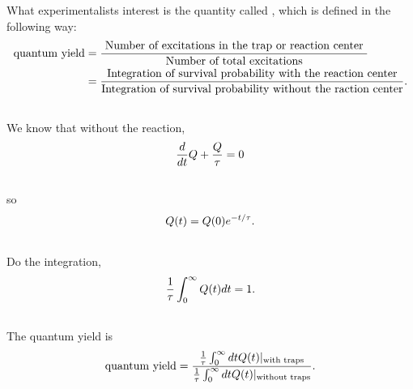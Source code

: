 \documentclass[letterpaper,10pt,english]{sphinxmanual}
\begin{document}
What experimentalists interest is the quantity called , which is defined in the following way:
\begin{gather}
\begin{split}\text{quantum yield} & = \frac{\text{ Number of excitations in the trap or reaction center } }{\text{Number of total excitations}}\\
& = \frac{\text{Integration of survival probability with the reaction center}}{\text{Integration of survival probability without the raction center}} .\end{split}\notag\\\begin{split}\end{split}\notag
\end{gather}
We know that without the reaction,
\begin{gather}
\begin{split}\frac{d}{dt}Q + \frac{Q}{\tau} = 0\end{split}\notag\\\begin{split}\end{split}\notag
\end{gather}
so
\begin{gather}
\begin{split}Q(t) = Q(0) e^{-t/\tau}.\end{split}\notag\\\begin{split}\end{split}\notag
\end{gather}
Do the integration,
\begin{gather}
\begin{split}\frac{1}{\tau} \int_0^\infty Q(t) dt = 1 .\end{split}\notag\\\begin{split}\end{split}\notag
\end{gather}
The quantum yield is
\begin{gather}
\begin{split}\text{quantum yield} = \frac{\frac{1}{\tau} \int_0^\infty dt Q(t) \vert_{\text{with traps}} }{\frac{1}{\tau} \int_0^\infty dt Q(t) \vert_{\text{without traps}} } .\end{split}\notag\\\begin{split}\end{split}\notag
\end{gather}
\end{document}
